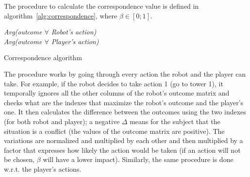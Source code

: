 The procedure to calculate the correspondence value is defined in algorithm~\ref{alg:correspondence}, where $\beta \in[0;1]$.
\begin{algorithm}[h]
\SetAlgoLined
{}
\BlankLine
\textit{Avg(outcome $\forall$ Robot's action)}\\
\textit{Avg(outcome $\forall$ Player's action)}\\

\caption{Correspondence algorithm}
\label{alg:correspondence}
\end{algorithm}
The procedure works by going through every action the robot and the player can take. For example, if the robot decides to take action 1 (go to tower 1), it temporally ignores all the other columns of the robot's outcome matrix and checks what are the indexes that maximize the robot's outcome and the player's one. It then calculates the difference between the outcomes using the two indexes (for both robot and player); a negative $\Delta$ means for the subject that the situation is a conflict (the values of the outcome matrix are positive). The variations are normalized and multiplied by each other and then multiplied by a factor that expresses how likely the action would be taken (if an action will not be chosen, $\beta$ will have a lower impact). Similarly, the same procedure is done w.r.t. the player's actions.

